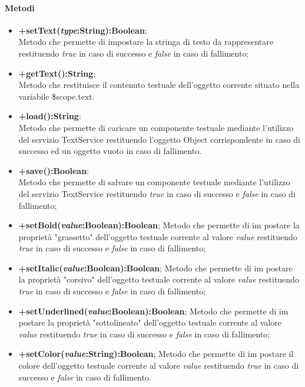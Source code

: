 \paragraph{Metodi}
\begin{itemize}
	\item \textbf{+setText(\textit{type}:String):Boolean}:\\
	Metodo che permette di impostare la stringa di testo da rappresentare restituendo \textit{true} in caso di successo e \textit{false} in caso di fallimento;
	\item \textbf{+getText():String}:\\
	Metodo che restituisce il contenuto testuale dell'oggetto corrente situato nella variabile \$scope.text.
	\item \textbf{+load():String}:\\
	Metodo che permette di caricare un componente testuale mediante l'utilizzo del servizio TextService restituendo l'oggetto Object corrispondente in caso di successo ed un oggetto vuoto in caso di fallimento.
	\item \textbf{+save():Boolean}:\\
	Metodo che permette di salvare un componente testuale mediante l'utilizzo del servizio TextService restituendo \textit{true} in caso di successo e \textit{false} in caso di fallimento;
	\item \textbf{+setBold(\textit{value}:Boolean):Boolean};
	Metodo che permette di im postare la proprietà "grassetto" dell'oggetto testuale corrente al valore \textit{value} restituendo \textit{true} in caso di successo e \textit{false} in caso di fallimento;
	\item \textbf{+setItalic(\textit{value}:Boolean):Boolean};
	Metodo che permette di im postare la proprietà "corsivo" dell'oggetto testuale corrente al valore \textit{value} restituendo \textit{true} in caso di successo e \textit{false} in caso di fallimento;
	\item \textbf{+setUnderlined(\textit{value}:Boolean):Boolean};
	Metodo che permette di im postare la proprietà "sottolineato" dell'oggetto testuale corrente al valore \textit{value} restituendo \textit{true} in caso di successo e \textit{false} in caso di fallimento;
	\item \textbf{+setColor(\textit{value}:String):Boolean};
	Metodo che permette di im postare il colore dell'oggetto testuale corrente al valore \textit{value} restituendo \textit{true} in caso di successo e \textit{false} in caso di fallimento.
	
\end{itemize}
